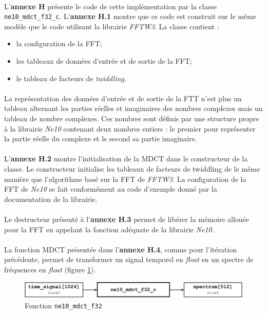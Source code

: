 \documentclass{article}
\begin{document}
    \paragraph{}
    L'\textbf{annexe H} présente le code de cette implémentation par la classe \texttt{ne10\_mdct\_f32\_c}. L'\textbf{annexe H.1} montre que ce code est construit sur le même modèle que le code utilisant la librairie \emph{FFTW3}. La classe contient :
    \begin{itemize}
        \item la configuration de la FFT;
        \item les tableaux de données d'entrée et de sortie de la FFT;
        \item le tableau de facteurs de \emph{twiddling}.
    \end{itemize}

    \paragraph{}
    La représentation des données d'entrée et de sortie de la FTT n'est plus un tableau alternant les parties réelles et imaginaires des nombres complexes mais un tableau de nombre complexes. Ces nombres sont définis par une structure propre à la librairie \emph{Ne10} contenant deux nombres entiers : le premier pour représenter la partie réelle du complexe et le second sa partie imaginaire.

    \paragraph{}
    L'\textbf{annexe H.2} montre l'initialisation de la MDCT dans le constructeur de la classe. Le constructeur initialise les tableaux de facteurs de twiddling de le même manière que l'algorithme basé sur la FFT de \emph{FFTW3}. La configuration de la FFT de \emph{Ne10} se fait conformément au code d'exemple donné par la documentation de la librairie\cite{Ne10}.

    \paragraph{}
    Le destructeur présenté à l'\textbf{annexe H.3} permet de libérer la mémoire allouée pour la FFT en appelant la fonction adéquate de la librairie \emph{Ne10}.

    \paragraph{}
    La fonction MDCT présentée dans l'\textbf{annexe H.4}, comme pour l'itération précédente, permet de transformer un signal temporel en \emph{float} en un spectre de fréquences en \emph{float} (figure \ref{fig:func_ne10_mdct_f32}).
    \begin{figure}[H]
        \centering
        \includegraphics[width=.8\linewidth]{./images/func_ne10_mdct_f32_c.pdf}
        \caption{Fonction \texttt{ne10\_mdct\_f32}}
        \label{fig:func_ne10_mdct_f32}
    \end{figure}
\end{document}
